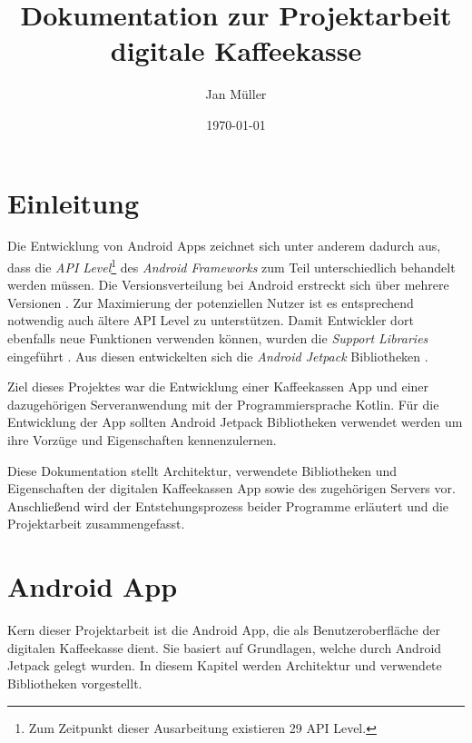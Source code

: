 \documentclass[a4paper, 11pt]{article}
\title{Dokumentation zur Projektarbeit digitale Kaffeekasse}
\author{Jan Müller}
\date{\today}
\begin{document}
\maketitle

\section{Einleitung}
\label{sec:intro}
Die Entwicklung von Android Apps zeichnet sich unter anderem dadurch aus, dass die \textit{API Level}\footnote{Zum Zeitpunkt dieser Ausarbeitung existieren 29 API Level.} des \textit{Android Frameworks} zum Teil unterschiedlich behandelt werden müssen.
Die Versionsverteilung bei Android erstreckt sich über mehrere Versionen \autocite{androidhistory}.
Zur Maximierung der potenziellen Nutzer ist es entsprechend notwendig auch ältere API Level zu unterstützen.
Damit Entwickler dort ebenfalls neue Funktionen verwenden können, wurden die \textit{Support Libraries} eingeführt \autocite{supportlibraries}.
Aus diesen entwickelten sich die \textit{Android Jetpack} Bibliotheken \autocite{androidjetpack}.

Ziel dieses Projektes war die Entwicklung einer Kaffeekassen App und einer dazugehörigen Serveranwendung mit der Programmiersprache Kotlin.
Für die Entwicklung der App sollten Android Jetpack Bibliotheken verwendet werden um ihre Vorzüge und Eigenschaften kennenzulernen.

Diese Dokumentation stellt Architektur, verwendete Bibliotheken und Eigenschaften der digitalen Kaffeekassen App sowie des zugehörigen Servers vor.
Anschließend wird der Entstehungsprozess beider Programme erläutert und die Projektarbeit zusammengefasst.

\section{Android App}
\label{sec:app}

Kern dieser Projektarbeit ist die Android App, die als Benutzeroberfläche der digitalen Kaffeekasse dient.
Sie basiert auf Grundlagen, welche durch Android Jetpack gelegt wurden.
In diesem Kapitel werden Architektur und verwendete Bibliotheken vorgestellt.
\end{document}
